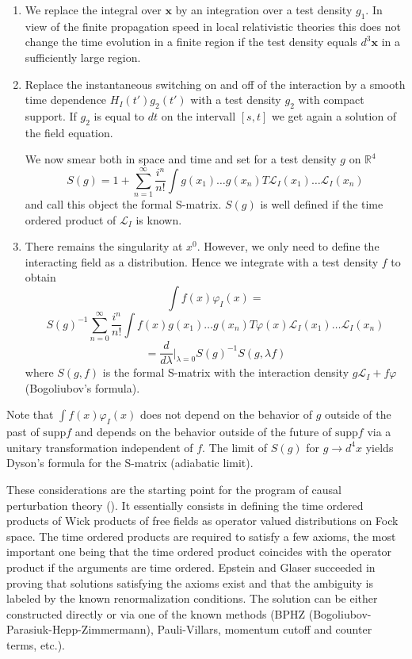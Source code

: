 \documentclass[11pt]{article}
\newcommand{\Lcal}{\mathcal {L}}
\newcommand{\RR}{\mathbb{R}}           %
\newcommand{\ph}{\varphi}
\newcommand{\1}{\mathds{1}}                         %
\begin{document}
{{{{{\begin{enumerate}
\item We replace the integral over $\mathbf x$ by an integration over a test density $g_1$. In view of the finite propagation speed in local relativistic theories this does not change the time evolution in a finite region if the test density equals $d^3\mathbf x$ in a sufficiently large region. 
\item Replace the instantaneous switching on and off of the interaction by a smooth time dependence $H_I(t')g_2(t')$ with a test density $g_2$ with compact support. If $g_2$ is equal to $dt$ on the intervall $[s,t]$ we get again a solution of the field equation.

We now smear both in space and time and set for a test density $g$ on $\RR^4$
\[S(g)=1+\sum_{n=1}^\infty\frac{i^n}{n!}\int g(x_1)\dots  g(x_n)T\Lcal_I(x_1)\dots \Lcal_I(x_n)\]
and call this object the formal S-matrix. $S(g)$ is well defined if the time ordered product of $\Lcal_I$ is known.
\item There remains the singularity at $x^0$. However, we only need to define the interacting field as a distribution. Hence we integrate with  a test density $f$ to obtain
\[\int f(x)\ph_I(x)=\]
\[S(g)^{-1}\sum_{n=0}^\infty \frac{i^n}{n!}\int f(x)g(x_1)\dots g(x_n)T\ph(x)\Lcal_I(x_1)\dots \Lcal_I(x_n)\]
\[=\frac{d}{d\lambda}|_{\lambda=0}S(g)^{-1}S(g,\lambda f)\] 
where $S(g,f)$ is the formal S-matrix with the interaction density $g\Lcal_I+f\ph$ (Bogoliubov's formula). 
\end{enumerate}

Note that $\int f(x)\ph_I(x)$ does not depend on the behavior of $g$ outside of the past of $\mathrm{supp}f$ and depends on the behavior outside of the future of $\mathrm{supp}f$ via a unitary transformation independent of $f$. The limit of $S(g)$ for $g\to d^4x$ yields Dyson's formula for the S-matrix (adiabatic limit).


These considerations are the starting point for the program of causal perturbation theory (\cite{SR,BS,BP,EG}).
{It essentially consists in defining the time ordered products of Wick products of free fields as operator valued distributions on Fock space.}
{The time ordered products are required to satisfy a few axioms, the most important one being that the time ordered product coincides with the operator product if the arguments are time ordered.}
{Epstein and Glaser \cite{EG} succeeded in proving that solutions satisfying the axioms exist and that the ambiguity is labeled by the known renormalization conditions. The solution can be either constructed directly or via one of the known methods (BPHZ  (Bogoliubov-Parasiuk-Hepp-Zimmermann), Pauli-Villars, momentum cutoff and counter terms, etc.).}

}}}}}
\end{document}
